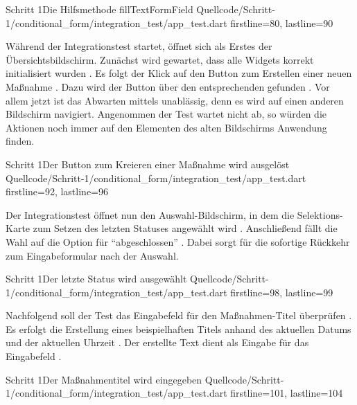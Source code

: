 \begin{alexlisting}{Schritt 1}{Die Hilfsmethode fillTextFormField}
  {Quellcode/Schritt-1/conditional_form/integration_test/app_test.dart}
  {firstline=80, lastline=90}
  \label{lst:Schritt1HilfsmethodeFillTextFormField}
\end{alexlisting}

Während der Integrationstest startet, öffnet sich als Erstes der Übersichtsbildschirm.
Zunächst wird gewartet, dass alle Widgets korrekt initialisiert wurden .
Es folgt der Klick auf den Button zum Erstellen einer neuen Maßnahme .
Dazu wird der Button über den entsprechenden  gefunden .
Vor allem jetzt ist das Abwarten mittels   unablässig, denn es wird auf einen anderen Bildschirm navigiert.
Angenommen der Test wartet nicht ab, so würden die Aktionen noch immer auf den Elementen des alten Bildschirms Anwendung finden. 

\begin{alexlisting}{Schritt 1}{Der Button zum Kreieren einer Maßnahme wird ausgelöst}
  {Quellcode/Schritt-1/conditional_form/integration_test/app_test.dart}
  {firstline=92, lastline=96}
  \label{lst:Schritt1ButtonKreierenMassnahmeAusgeloest}
\end{alexlisting}

Der Integrationstest öffnet nun den Auswahl-Bildschirm, in dem die Selektions-Karte zum Setzen des letzten Statuses angewählt wird .
Anschließend fällt die Wahl auf die Option für \enquote{abgeschlossen} .
Dabei sorgt  für die sofortige Rückkehr zum Eingabeformular nach der Auswahl.
 
\begin{alexlisting}{Schritt 1}{Der letzte Status wird ausgewählt}
  {Quellcode/Schritt-1/conditional_form/integration_test/app_test.dart}
  {firstline=98, lastline=99}
  \label{lst:Schritt1LetzterStatusWirdAusgewählt}
\end{alexlisting}

Nachfolgend soll der Test das Eingabefeld für den Maßnahmen-Titel überprüfen \Lst{\ref{lst:Schritt1MassnahmentitelWirdEingegeben}}.
Es erfolgt die Erstellung eines beispielhaften Titels anhand des aktuellen Datums und der aktuellen Uhrzeit .
Der erstellte Text dient als Eingabe für das Eingabefeld . 

\begin{alexlisting}{Schritt 1}{Der Maßnahmentitel wird eingegeben}
  {Quellcode/Schritt-1/conditional_form/integration_test/app_test.dart}
  {firstline=101, lastline=104}
  \label{lst:Schritt1MassnahmentitelWirdEingegeben}
\end{alexlisting}

